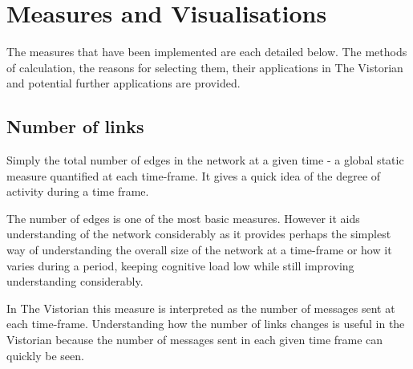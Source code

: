 \section{Measures and Visualisations}
The measures that have been implemented are each detailed below. The methods of calculation, the reasons for selecting them, their applications in The Vistorian and potential further applications are provided.

\subsection{Number of links}
Simply the total number of edges in the network at a given time - a global static measure quantified at each time-frame. It gives a quick idea of the degree of activity during a time frame.

The number of edges is one of the most basic measures. However it aids understanding of the network considerably as it provides perhaps the simplest way of understanding the overall size of the network at a time-frame or how it varies during a period, keeping cognitive load low while still improving understanding considerably.

In The Vistorian this measure is interpreted as the number of messages sent at each time-frame. 
Understanding how the number of links changes is useful in the Vistorian because the number of messages sent in each given time frame can quickly be seen.


